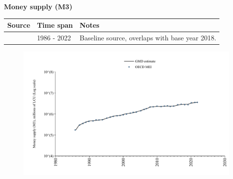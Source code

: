 \documentclass[12pt,a4paper,landscape]{article}
\begin{document}
\begin{adjustbox}{max totalsize={\paperwidth}{\paperheight},center}
\begin{minipage}[t][\textheight][t]{\textwidth}
\vspace*{0.5cm}
{}
\begin{center}
{\Large\bfseries Money supply (M3)}
\end{center}
\vspace{0.5cm}
\begin{table}[H]
\centering
\small
\begin{tabular}{|l|l|l|}
\hline
\textbf{Source} & \textbf{Time span} & \textbf{Notes} \\
\hline
\rowcolor{white}\cite{OECD_MEI}& 1986 - 2022 &Baseline source, overlaps with base year 2018. \\
\hline
\end{tabular}
\end{table}
\begin{figure}[H]
\centering
\includegraphics[width=\textwidth,height=0.6\textheight,keepaspectratio]{graphs/GBR_M3.pdf}
\end{figure}
\end{minipage}
\end{adjustbox}
\end{document}
